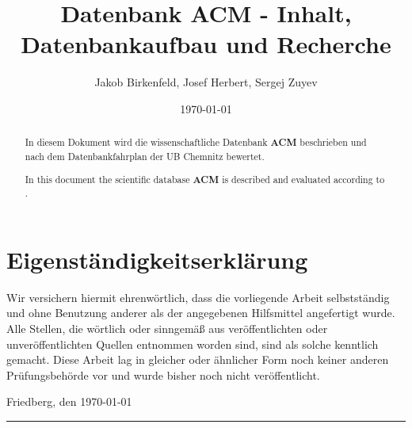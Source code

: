 \documentclass[
	ngerman,
	parskip=half,
	headsepline,
	fontsize=12pt,
	DIV=13,
	listof=leveldown,
	]{scrreprt}
\author{Jakob Birkenfeld, Josef Herbert, Sergej Zuyev}
\title{Datenbank ACM - Inhalt, Datenbankaufbau und Recherche}
\date{\today}
\begin{document}
	\begin{titlepage}
		\maketitle
	\end{titlepage}
	
	\begin{abstract}
		In diesem Dokument wird die wissenschaftliche Datenbank \textbf{ACM} beschrieben und nach dem Datenbankfahrplan der UB Chemnitz \cite{resource:dbf} bewertet.
		
		In this document the scientific database \textbf{ACM} is described and evaluated according to \cite{resource:dbf}.
	\end{abstract}

	\clearpage
	
		
	\chapter*{Eigenständigkeitserklärung}
	
	Wir versichern hiermit ehrenwörtlich, dass die vorliegende Arbeit selbstständig und ohne Benutzung anderer als der angegebenen Hilfsmittel angefertigt wurde. Alle Stellen, die wörtlich oder sinngemäß aus veröffentlichten oder unveröffentlichten Quellen entnommen worden sind, sind als solche kenntlich gemacht. Diese Arbeit lag in gleicher oder ähnlicher Form noch keiner anderen Prüfungsbehörde vor und wurde bisher noch nicht veröffentlicht.
	
	Friedberg, den \today
	
	
	\rule[-0.2cm]{5cm}{0.5pt}
	
	\textsc{\theauthor} 
	
	
	\clearpage
	
	
		\tableofcontents
		\listoffigures			
		
		\clearpage
	
\end{document}
